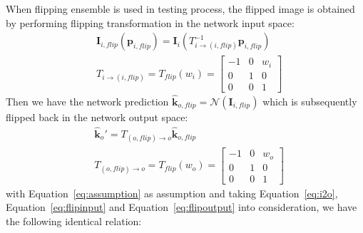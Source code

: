 \documentclass[10pt,journal,compsoc]{IEEEtran}
\begin{document}
When flipping ensemble is used in testing process, the flipped image is obtained by performing flipping transformation in the network input space:
\begin{equation}
\label{eq:flipinput}
    \begin{split}
    &\textbf{I}_{i,flip}(\textbf{p}_{i,flip}) = \textbf{I}_{i}(T_{i\rightarrow (i,flip)}^{-1}\textbf{p}_{i,flip})\\
    &T_{i\rightarrow (i,flip)} = T_{flip}(w_i) =    \begin{bmatrix} -1 & 0 & w_i \\
                                                                        0 & 1 & 0 \\
                                                                        0 & 0 &1 \end{bmatrix}
    \end{split}
\end{equation}
Then we have the network prediction $\hat{\textbf{k}}_{o,flip} = \mathcal{N}(\textbf{I}_{i,flip})$ which is subsequently flipped back in the network output space:
\begin{equation}
\label{eq:flipoutput}
    \begin{split}
    &\hat{\textbf{k}}_{o}' = T_{(o,flip)\rightarrow o}\hat{\textbf{k}}_{o,flip}\\
    &T_{(o,flip)\rightarrow o} = T_{flip}(w_o) =    \begin{bmatrix}   -1 & 0 & w_o \\
                                                                            0 & 1 & 0 \\
                                                                            0 & 0 &1 \end{bmatrix}
    \end{split}
\end{equation}
with Equation~\ref{eq:assumption} as assumption and taking Equation~\ref{eq:i2o}, Equation~\ref{eq:flipinput} and Equation~\ref{eq:flipoutput} into consideration, we have the following identical relation:
\end{document}
